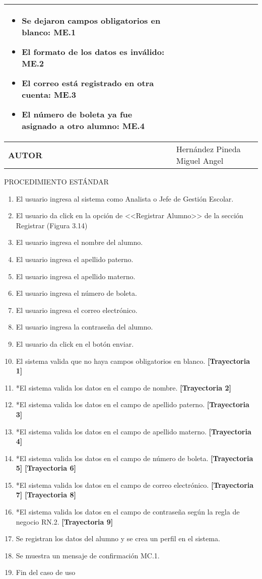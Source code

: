 \begin{longtable}{ | p{6cm} | p{10cm} |}
\begin{itemize}
    \item Se dejaron campos obligatorios en blanco: ME.1
    \item El formato de los datos es inválido: ME.2
    \item El correo está registrado en otra cuenta: ME.3
    \item El número de boleta ya fue asignado a otro alumno: ME.4
\end{itemize}\\
\hline
\textbf{AUTOR} & Hernández Pineda Miguel Angel\\
\hline
\end{longtable}
\vspace*{1cm}
\noindent
\Large{PROCEDIMIENTO ESTÁNDAR}
\large{}
\begin{enumerate}
    \item El usuario ingresa al sistema como Analista o Jefe de Gestión Escolar.
    \item El usuario da click en la opción de <<Registrar Alumno>> de la sección Registrar (Figura 3.14)
    \item El usuario ingresa el nombre del alumno.
    \item El usuario ingresa el apellido paterno.
    \item El usuario ingresa el apellido materno.
    \item El usuario ingresa el número de boleta.
    \item El usuario ingresa el correo electrónico.
    \item El usuario ingresa la contraseña del alumno.
    \item El usuario da click en el botón enviar.
    \item El sistema valida que no haya campos obligatorios en blanco. \textbf{[Trayectoria 1]}
    \item *El sistema valida los datos en el campo de nombre. \textbf{[Trayectoria 2]}
    \item *El sistema valida los datos en el campo de apellido paterno. \textbf{[Trayectoria 3]}
    \item *El sistema valida los datos en el campo de apellido materno. \textbf{[Trayectoria 4]}
    \item *El sistema valida los datos en el campo de número de boleta. \textbf{[Trayectoria 5]} \textbf{[Trayectoria 6]}
    \item *El sistema valida los datos en el campo de correo electrónico. \textbf{[Trayectoria 7]} \textbf{[Trayectoria 8]}
    \item *El sistema valida los datos en el campo de contraseña según la regla de negocio RN.2. \textbf{[Trayectoria 9]}
    \item Se registran los datos del alumno y se crea un perfil en el sistema.
    \item Se muestra un mensaje de confirmación MC.1.
    \item Fin del caso de uso
\end{enumerate}
